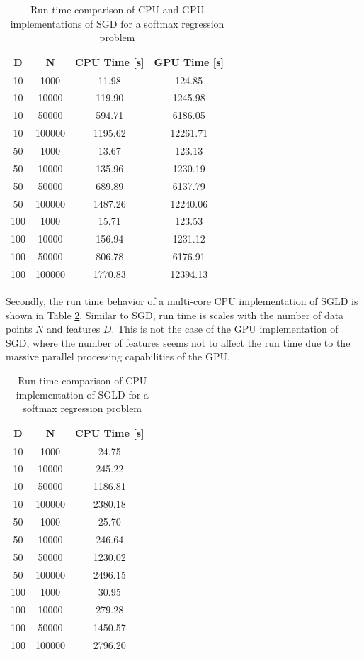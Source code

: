 \documentclass[9pt,lineno]{crone}
\begin{document}
\begin{table}[h]
	\centering
 \begin{tabular}{|c|c|c|c|}
 	\hline 
 	D & N & CPU Time [s] & GPU Time [s] \\ 
 	\hline 
 	10 &	1000&	11.98&	124.85\\
 	10&	10000&	119.90&	1245.98\\
 	10&	50000&	594.71&	6186.05\\
 	10&	100000&	1195.62&	12261.71\\
 	\hline
 	50&	1000&	13.67&	123.13\\
 	50&	10000&	135.96&	1230.19\\
 	50&	50000&	689.89&	6137.79\\
 	50&	100000&	1487.26&	12240.06\\
 	\hline

 	100&	1000&	15.71&	123.53\\
 	100	&10000&	156.94&	1231.12\\
 	100&	50000&	806.78&	6176.91\\
 	100&	100000&	1770.83&	12394.13\\
 	\hline 
 \end{tabular}
\caption{Run time comparison of CPU and GPU implementations of SGD for a softmax regression problem}
\label{tab:sgd} 
\end{table}
 
Secondly, the run time behavior of a multi-core CPU implementation of SGLD is shown in Table \ref{tab:sgld}. Similar to SGD, run time is scales with the number of data points $N$ and features $D$. This is not the case of the GPU implementation of SGD, where the number of features seems not to affect the run time due to the massive parallel processing capabilities of the GPU.

\begin{table}[h]
	\centering
	\begin{tabular}{|c|c|c|c|}
		\hline 
		D & N & CPU Time [s]  \\ 
		\hline 
10	& 1000& 	24.75\\
10	& 10000& 	245.22\\
10	& 50000& 	1186.81\\
10	& 100000	& 2380.18\\
\hline
50	& 1000	& 25.70\\
50	& 10000	& 246.64\\
50	& 50000	& 1230.02\\
50 & 	100000	& 2496.15 \\
\hline
100	& 1000	& 30.95\\
100	& 10000	& 279.28\\
100	& 50000	& 1450.57\\
100	& 100000& 	2796.20 \\
		\hline 
\end{tabular}
\caption{Run time comparison of CPU implementation of SGLD for a softmax regression problem}
\label{tab:sgld} 
\end{table}


\end{document}
